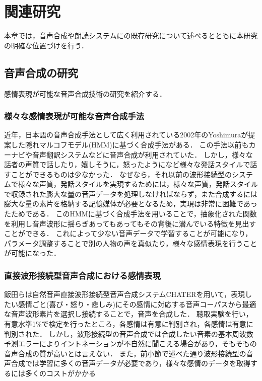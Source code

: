 \chapter{関連研究}
本章では，音声合成や朗読システムにの既存研究について述べるとともに本研究の明確な位置づけを行う．

\section{音声合成の研究}\label{research:speech_synthesis}
感情表現が可能な音声合成技術の研究を紹介する．

\subsection{様々な感情表現が可能な音声合成手法}
近年，日本語の音声合成手法として広く利用されている2002年のYoshimura\cite{yoshimura}が提案した隠れマルコフモデル(HMM)に基づく合成手法がある．
この手法以前もカーナビや音声翻訳システムなどに音声合成が利用されていた．
しかし，様々な話者の声質で話したり，嬉しそうに，怒ったようになど様々な発話スタイルで話すことができるものは少なかった．
なぜなら，それ以前の波形接続型のシステムで様々な声質，発話スタイルを実現するためには，様々な声質，発話スタイルで収録された膨大な量の音声データを処理しなければならず，また合成するには膨大な量の素片を格納する記憶媒体が必要となるため，実現は非常に困難であったためである．
このHMMに基づく合成手法を用いることで，抽象化された関数を利用し音声波形に揺らぎあってもあってもその背後に潜んでいる特徴を見出すことができる．
これによって少ない音声データで学習することが可能になり，パラメータ調整することで別の人物の声を真似たり，様々な感情表現を行うことが可能になった．

\subsection{直接波形接続型音声合成における感情表現}
飯田ら\cite{iida}は自然音声直接波形接続型音声合成システムCHATERを用いて，表現したい感情ごと(喜び・怒り・悲しみ)にその感情に対応する音声コーパスから最適な音声波形素片を選択し接続することで，音声を合成した．
聴取実験を行い，有意水準1\%で検定を行ったところ，各感情は有意に判別され，各感情は有意に判別された．
しかし，波形接続型の音声合成では合成したい音素の基本周波数予測エラーによりイントネーションが不自然に聞こえる場合があり，そもそもの音声合成の質が高いとは言えない．
また，前小節で述べた通り波形接続型の音声合成では学習に多くの音声データが必要であり，様々な感情のデータを取得するには多くのコストがかかる

